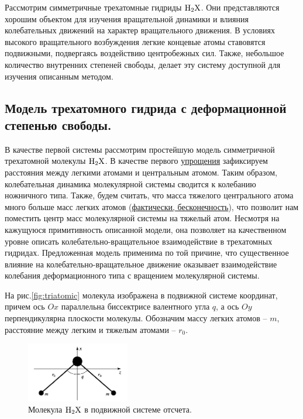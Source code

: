 Рассмотрим симметричные трехатомные гидриды $\ce{H2X}$. Они представляются хорошим объектом для изучения вращательной динамики и влияния колебательных движений на характер вращательного движения. В условиях высокого вращательного возбуждения легкие концевые атомы ставовятся подвижными, подвергаясь воздействию центробежных сил. Также, небольшое количество внутренних степеней свободы, делает эту систему доступной для изучения описанным методом. 

\subsection{Модель трехатомного гидрида с деформационной степенью свободы.}

В качестве первой системы рассмотрим простейшую модель симметричной трехатомной молекулы $\ce{H2X}$. В качестве первого \underline{упрощения} зафиксируем расстояния между легкими атомами и центральным атомом. Таким образом, колебательная динамика молекулярной системы сводится к колебанию ножничного типа. Также, будем считать, что масса тяжелого центрального атома много больше масс легких атомов (\underline{фактически, бесконечность}), что позволит нам поместить центр масс молекулярной системы на тяжелый атом. Несмотря на кажущуюся примитивность описанной модели, она позволяет на качественном уровне описать колебательно-вращательное взаимодействие в трехатомных гидридах. Предложенная модель применима по той причине, что существенное влияние на колебательно-вращательное движение оказывает взаимодействие колебания деформационного типа с вращением молекулярной системы.

На рис.\eqref{fig:triatomic} молекула изображена в подвижной системе координат, причем ось $Ox$ параллельна биссектрисе валентного угла $q$, а ось $Oy$ перпендикулярна плоскости молекулы. Обозначим массу легких атомов -- $m$, расстояние между легким и тяжелым атомами -- $r_0$. 

\begin{figure}[!ht]
  \centering
	\includegraphics[width=0.4\textwidth]{../pictures/triatomic_fixed.png}
	\caption{Молекула $\ce{H2X}$ в подвижной системе отсчета.}
	\label{fig:triatomic}
\end{figure}

